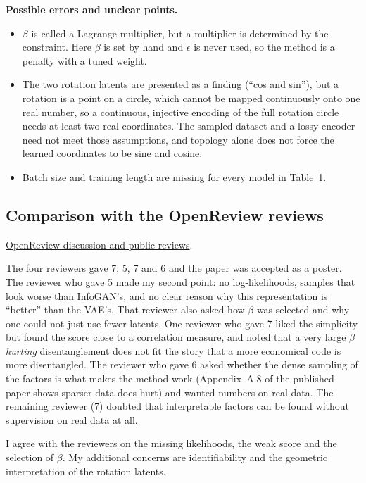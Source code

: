 \textbf{Possible errors and unclear points.}
\begin{itemize}
  \item $\beta$ is called a Lagrange multiplier, but a multiplier is determined by the constraint. Here $\beta$ is set by hand and $\epsilon$ is never used, so the method is a penalty with a tuned weight.
  \item The two rotation latents are presented as a finding (``cos and sin''), but a rotation is a point on a circle, which cannot be mapped continuously onto one real number, so a continuous, injective encoding of the full rotation circle needs at least two real coordinates. The sampled dataset and a lossy encoder need not meet those assumptions, and topology alone does not force the learned coordinates to be sine and cosine.
  \item Batch size and training length are missing for every model in Table~1.
\end{itemize}

\subsection{Comparison with the OpenReview reviews}
\noindent\href{https://openreview.net/forum?id=Sy2fzU9gl}{OpenReview discussion and public reviews}.

The four reviewers gave 7, 5, 7 and 6 and the paper was accepted as a poster. The reviewer who gave 5 made my second point: no log-likelihoods, samples that look worse than InfoGAN's, and no clear reason why this representation is ``better'' than the VAE's. That reviewer also asked how $\beta$ was selected and why one could not just use fewer latents. One reviewer who gave 7 liked the simplicity but found the score close to a correlation measure, and noted that a very large $\beta$ \emph{hurting} disentanglement does not fit the story that a more economical code is more disentangled. The reviewer who gave 6 asked whether the dense sampling of the factors is what makes the method work (Appendix~A.8 of the published paper shows sparser data does hurt) and wanted numbers on real data. The remaining reviewer (7) doubted that interpretable factors can be found without supervision on real data at all.

I agree with the reviewers on the missing likelihoods, the weak score and the selection of $\beta$. My additional concerns are identifiability and the geometric interpretation of the rotation latents.



